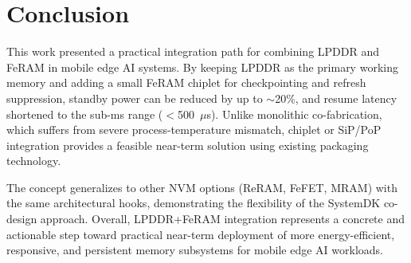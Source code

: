 \section{Conclusion}

This work presented a practical integration path for combining LPDDR and FeRAM in mobile edge AI systems. 
By keeping LPDDR as the primary working memory and adding a small FeRAM chiplet for checkpointing and refresh suppression, 
standby power can be reduced by up to $\sim$20\%, and resume latency shortened to the sub-ms range ($<$500~$\mu$s). 
Unlike monolithic co-fabrication, which suffers from severe process-temperature mismatch, 
chiplet or SiP/PoP integration provides a feasible near-term solution using existing packaging technology. 

The concept generalizes to other NVM options (ReRAM, FeFET, MRAM) with the same architectural hooks, 
demonstrating the flexibility of the SystemDK co-design approach. 
Overall, LPDDR+FeRAM integration represents a concrete and actionable step 
toward practical near-term deployment of more energy-efficient, responsive, and persistent memory subsystems for mobile edge AI workloads.

